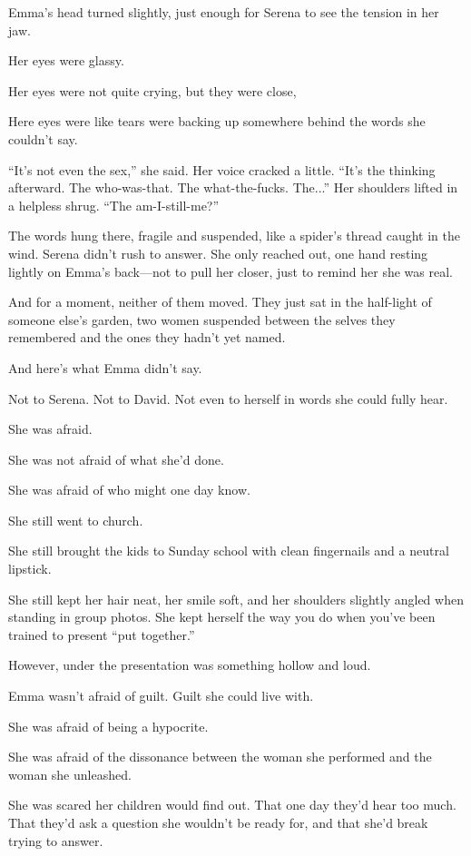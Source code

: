 Emma’s head turned slightly, just enough for Serena to see the tension in her jaw. 

Her eyes were glassy. 

Her eyes were not quite crying, but they were close, 

Here eyes were like tears were backing up somewhere behind the words she couldn’t 
say. 

``It’s not even the sex,'' she said. Her voice cracked a little. ``It’s the thinking afterward. The 
who-was-that. The what-the-fucks. The...'' Her shoulders lifted in a helpless shrug. ``The am-I-still-me?''

The words hung there, fragile and suspended, like a spider’s thread caught in the wind. Serena didn’t 
rush to answer. She only reached out, one hand resting lightly on Emma’s back—not to pull her closer, 
just to remind her she was real.

And for a moment, neither of them moved. They just sat in the half-light of someone else’s garden, 
two women suspended between the selves they remembered and the ones they hadn’t yet named.

And here’s what Emma didn’t say.

Not to Serena.
Not to David.
Not even to herself in words she could fully hear.

She was afraid. 

She was not afraid of what she’d done.

She was afraid of who might one day know.

She still went to church.

She still brought the kids to Sunday school with clean fingernails and a neutral lipstick.

She still kept her hair neat, her smile soft, and her shoulders slightly angled when standing in group 
photos. She kept herself the way you do when you’ve been trained to present ``put together.''

However, under the presentation was something hollow and loud.

Emma wasn’t afraid of guilt. Guilt she could live with.

She was afraid of being a hypocrite.

She was afraid of the dissonance between the woman she performed and the woman she unleashed.

She was scared her children would find out.
That one day they’d hear too much. That they'd ask a question she wouldn't be ready 
for, and that she'd break trying to answer.


